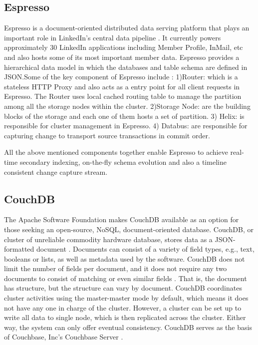 {\subsection{Espresso}

     Espresso is a document-oriented
     distributed data serving platform that plays an important role in
     LinkedIn's central data pipeline \cite{www-Linkedin-Espresso}.
     It currently powers
     approximately 30 LinkedIn applications including Member Profile,
     InMail, etc and also hosts some of its most important member
     data. Espresso provides a hierarchical data model in which the
     databases and table schema are defined in JSON.Some of the key
     component of Espresso include : 1)Router: which is a stateless
     HTTP Proxy and also acts as a entry point for all client requests
     in Espresso. The Router uses local cached routing table to manage
     the partition among all the storage nodes within the
     cluster. 2)Storage Node: are the building blocks of the storage
     and each one of them hosts a set of partition. 3) Helix: is
     responsible for cluster management in Espresso. 4) Databus: are
     responsible for capturing change to transport source transactions
     in commit order.

     All the above mentioned components together enable Espresso to achieve 
     real-time secondary indexing, on-the-fly schema evolution and also a 
     timeline consistent change capture stream.

     \pv

\subsection{CouchDB \cv}
     
     The Apache Software Foundation makes CouchDB available as an
     option for those seeking an open-source, NoSQL, document-oriented
     database. CouchDB, or cluster of unreliable commodity hardware
     database, stores data as a
     JSON-formatted document \cite{www-exploringcdb-couchdb}.
     Documents can consist of a variety of
     field types, e.g., text, booleans or lists, as well as metadata
     used by the software. CouchDB does not limit the number of fields per
     document, and it does not
     require any two documents to consist of matching or even similar
     fields \cite{www-techoverview-couchdb}. That is, the document has
     structure, but the structure
     can vary by document.  CouchDB coordinates cluster activities
     using the master-master mode by default, which means it does not
     have any one in charge of the cluster.  However, a cluster can be
     set up to write all data to single node, which is then replicated
     across the cluster.  Either way, the system can only offer
     eventual consistency. CouchDB serves as the basis of
     Couchbase, Inc's Couchbase Server  \cite{www-cdb-vs-cbs-couchdb}.

}

